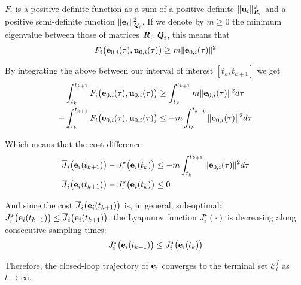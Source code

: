 \begin{gg_box}
  $F_i$ is a positive-definite function as a sum of a positive-definite
  $\|\bm{\mathbf{u}}_i\|^2_{\bm{\mathit{R}}_i}$ and a positive semi-definite function
  $\|\bm{\mathbf{e}}_i\|^2_{\bm{\mathit{Q}}_i}$. If we denote by $m \geq 0$ the
  minimum eigenvalue between those of matrices $\bm{\mathit{R}}_i, \bm{\mathit{Q}}_i$, this
  means that
  $$F_i \big(\bm{\mathbf{e}}_{0,i}(\tau), \bm{\mathbf{u}}_{0,i} (\tau)\big) \geq m \|\bm{\mathbf{e}}_{0,i}(\tau)\|^2$$

  By integrating the above between our interval of interest $[t_k, t_{k+1}]$ we get
  \begin{align}
    \int_{t_k}^{t_{k+1}} F_i \big(\bm{\mathbf{e}}_{0,i}(\tau), \bm{\mathbf{u}}_{0,i} (\tau)\big) &\geq \int_{t_k}^{t_{k+1}} m \|\bm{\mathbf{e}}_{0,i}(\tau)\|^2 d\tau \\
    -\int_{t_k}^{t_{k+1}} F_i \big(\bm{\mathbf{e}}_{0,i}(\tau), \bm{\mathbf{u}}_{0,i} (\tau)\big) &\leq -m \int_{t_k}^{t_{k+1}} \|\bm{\mathbf{e}}_{0,i}(\tau)\|^2 d\tau
  \end{align}
\end{gg_box}

Which means that the cost difference
\begin{align}
  \overline{J}_i\big(\bm{\mathbf{e}}_i(t_{k+1})\big) - J_i^{\star}\big(\bm{\mathbf{e}}_i(t_k)\big)
  &\leq -m \int_{t_k}^{t_{k+1}} \|\bm{\mathbf{e}}_{0,i}(\tau)\|^2 d\tau \\
  \overline{J}_i\big(\bm{\mathbf{e}}_i(t_{k+1})\big) - J_i^{\star}\big(\bm{\mathbf{e}}_i(t_k)\big) &\leq 0
\end{align}

And since the cost $\overline{J}_i\big(\bm{\mathbf{e}}_i(t_{k+1})\big)$ is, in general,
sub-optimal: $J_i^{\star}\big(\bm{\mathbf{e}}_i(t_{k+1})\big) \leq \overline{J}_i\big(\bm{\mathbf{e}}_i(t_{k+1})\big)$,
the Lyapunov function $J_i^{\star}(\cdot)$ is decreasing along consecutive
sampling times:
\begin{align}
 J_i^{\star}\big(\bm{\mathbf{e}}_i(t_{k+1})\big) \leq J_i^{\star}\big(\bm{\mathbf{e}}_i(t_k)\big)
\end{align}

Therefore, the closed-loop trajectory of $\bm{\mathbf{e}}_i$ converges to the terminal
set $\mathcal{E}_i^f$ as $t \to \infty$. \qedsymbol
